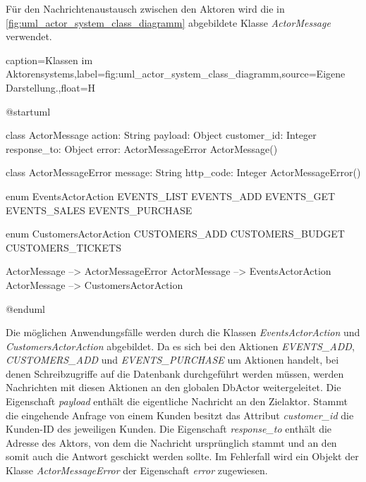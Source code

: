 Für den Nachrichtenaustausch zwischen den Aktoren wird die in \autoref{fig:uml_actor_system_class_diagramm} abgebildete Klasse \textit{ActorMessage} verwendet.

\begin{dhbwfigure}{caption=Klassen im Aktorensystems,label=fig:uml_actor_system_class_diagramm,source={Eigene Darstellung.},float=H}
    \begin{plantuml}
        @startuml

        class ActorMessage {
            action: String
            payload: Object 
            customer_id: Integer
            response_to: Object
            error: ActorMessageError
            ActorMessage()
        }

        class ActorMessageError {
            message: String
            http_code: Integer 
            ActorMessageError()
        }

        enum EventsActorAction {
            EVENTS_LIST
            EVENTS_ADD
            EVENTS_GET
            EVENTS_SALES
            EVENTS_PURCHASE
        }

        enum CustomersActorAction {
            CUSTOMERS_ADD
            CUSTOMERS_BUDGET
            CUSTOMERS_TICKETS
        }

        ActorMessage --> ActorMessageError
        ActorMessage --> EventsActorAction
        ActorMessage --> CustomersActorAction

        @enduml
    \end{plantuml}
\end{dhbwfigure}\unskip

Die möglichen Anwendungsfälle werden durch die Klassen \textit{EventsActorAction} und \textit{CustomersActorAction} abgebildet.
Da es sich bei den Aktionen \textit{EVENTS_ADD}, \textit{CUSTOMERS_ADD} und \textit{EVENTS_PURCHASE} um Aktionen handelt, bei denen Schreibzugriffe auf die Datenbank durchgeführt werden müssen, werden Nachrichten mit diesen Aktionen an den globalen DbActor weitergeleitet.
Die Eigenschaft \textit{payload} enthält die eigentliche Nachricht an den Zielaktor.
Stammt die eingehende Anfrage von einem Kunden besitzt das Attribut \textit{customer_id} die Kunden-ID des jeweiligen Kunden.
Die Eigenschaft \textit{response_to} enthält die Adresse des Aktors, von dem die Nachricht ursprünglich stammt und an den somit auch die Antwort geschickt werden sollte.
Im Fehlerfall wird ein Objekt der Klasse \textit{ActorMessageError} der Eigenschaft \textit{error} zugewiesen.
